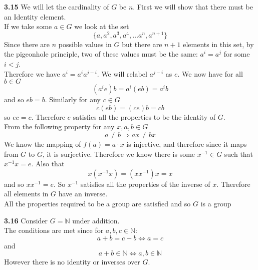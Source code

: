 \documentclass[12pt]{article}
\newenvironment{ques}{\vspace{2 ex}}{\vspace{2 ex}}
\theoremstyle{definition}
\begin{document}
\begin{ques}
	\textbf{3.15}
		We will let the cardinality of $G$ be $n$. First we will show
		that there must be an Identity element.\\
		If we take some $a \in G$ we look at the set 
		$$\{a, a^2, a^3, a^4, \dots a^n, a^{n+1}\}$$
		Since there are $n$ possible values in $G$ but there are $n+1$
		elements in this set, by the pigeonhole principle, two of these
		values must be the same: $a^i = a^j$ for some $i < j$.\\
		Therefore we have $a^i = a^i a^{j-i}$. We will relabel
		$a^{j-i}$ as $e$. We now have for all $b \in G$
		$$(a^ie)b = a^{i}(eb) = a^{i}b$$
		and so $eb = b$. Similarly for any $c \in G$
		$$c(eb) = (ce)b = cb$$
		so $ec = c$. Therefore $e$ satisfies all the properties to be
		the identity of $G$.\\
		From the following property for any $x, a, b \in G$
		$$a \neq b \Rightarrow ax \neq bx$$
		We know the mapping of $f(a) = a \cdot x$ is injective, and
		therefore since it maps from $G$ to $G$, it is surjective.
		Therefore we know there is some $x^{-1} \in G$ such that
		$x^{-1} x = e$. Also that
		$$x(x^{-1}x) = (xx^{-1})x = x$$
		and so $xx^{-1} = e$. So $x^{-1}$ satisfies all the properties
		of the inverse of $x$. Therefore all elements in $G$ have an inverse.\\
		All the properties required to be a group are satisfied and
		so $G$ is a group
\end{ques}

\begin{ques}
	\textbf{3.16}
		Consider $G = \mathbb{N}$ under addition.\\
		The conditions are met since for $a,b,c \in \mathbb{N}$:
		$$a + b = c + b \Leftrightarrow a = c$$
		and 
		$$a + b \in \mathbb{N} \Leftrightarrow a,b \in \mathbb{N}$$
		However there is no identity or inverses over $G$.
\end{ques}
\end{document}
